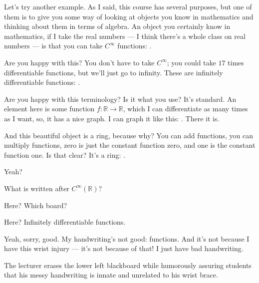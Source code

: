 \begin{speech}[00:57:05 - 00:58:27]
Let's try another example. As I said, this course has several purposes, but one of them is to give you some way of looking at objects you know in mathematics and thinking about them in terms of algebra. An object you certainly know in mathematics, if I take the real numbers --- I think there's a whole class on real numbers --- is that you can take $C^\infty$ functions: .

Are you happy with this? You don't have to take $C^\infty$; you could take $17$ times differentiable functions, but we'll just go to infinity. These are infinitely differentiable functions: .

Are you happy with this terminology? Is it what you use? It's standard. An element here is some function $f \colon \mathbb{R} \to \mathbb{R}$, which I can differentiate as many times as I want, so, it has a nice graph. I can graph it like this: . There it is.

And this beautiful object is a ring,  because why? You can add functions, you can multiply functions, zero is just the constant function zero, and one is the constant function one. Is that clear? It's a ring: .

Yeah?
\end{speech}

\begin{student}
What is written after $C^\infty(\mathbb{R})$?
\end{student}

\begin{speech}[00:58:27 - 00:58:45]
Here? Which board?

Here? Infinitely differentiable functions.

Yeah, sorry, good. My handwriting's not good: functions. And it's not because I have this wrist injury --- it's not because of that! I just have bad handwriting.
\end{speech}

\begin{note}
The lecturer erases the lower left blackboard while humorously assuring students that his messy handwriting is innate and unrelated to his wrist brace.
\end{note}

